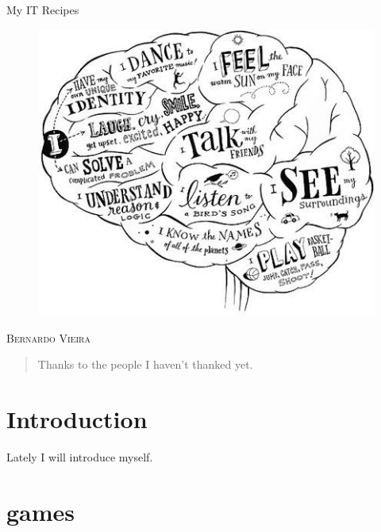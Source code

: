 \documentclass{report}
\begin{document}
\begin{titlepage}
\vspace*{\fill}
\begin{center}
{\fontsize{50}{60}\selectfont My IT Recipes}\\[0.5cm]
\begin{figure}[h]
\begin{center}
\includegraphics[scale=0.5]{Figs/brain.jpg}
\end{center}
\end{figure}
\vspace{4em}
\textsc{\Large Bernardo Vieira}\\[1em]
\end{center}
\vspace*{\fill}
\end{titlepage}

\maketitle

\begin{abstract}
Thanks to the people I haven't thanked yet.
\end{abstract}
\clearpage
\tableofcontents
\clearpage

\chapter{Introduction}
Lately I will introduce myself.

\chapter{games}
\end{document}
